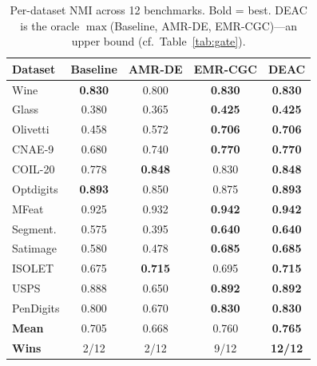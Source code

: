 \begin{table}[!t]
\centering
\caption{Per-dataset NMI across 12 benchmarks. Bold = best. DEAC is the oracle $\max$(Baseline, AMR-DE, EMR-CGC)---an upper bound (cf.\ Table~\ref{tab:gate}).}
\label{tab:nmi_per_dataset}
\footnotesize
\setlength{\tabcolsep}{4pt}
\begin{tabular}{lcccc}
\toprule
Dataset & Baseline & AMR-DE & EMR-CGC & \textbf{DEAC} \\
\midrule
Wine         & \textbf{0.830} & 0.800 & \textbf{0.830} & \textbf{0.830} \\
Glass        & 0.380 & 0.365 & \textbf{0.425} & \textbf{0.425} \\
Olivetti     & 0.458 & 0.572 & \textbf{0.706} & \textbf{0.706} \\
CNAE-9       & 0.680 & 0.740 & \textbf{0.770} & \textbf{0.770} \\
COIL-20      & 0.778 & \textbf{0.848} & 0.830 & \textbf{0.848} \\
Optdigits    & \textbf{0.893} & 0.850 & 0.875 & \textbf{0.893} \\
MFeat        & 0.925 & 0.932 & \textbf{0.942} & \textbf{0.942} \\
Segment.     & 0.575 & 0.395 & \textbf{0.640} & \textbf{0.640} \\
Satimage     & 0.580 & 0.478 & \textbf{0.685} & \textbf{0.685} \\
ISOLET       & 0.675 & \textbf{0.715} & 0.695 & \textbf{0.715} \\
USPS         & 0.888 & 0.650 & \textbf{0.892} & \textbf{0.892} \\
PenDigits    & 0.800 & 0.670 & \textbf{0.830} & \textbf{0.830} \\
\midrule
\textbf{Mean} & 0.705 & 0.668 & 0.760 & \textbf{0.765} \\
\textbf{Wins} & 2/12 & 2/12 & 9/12 & \textbf{12/12} \\
\bottomrule
\end{tabular}
\end{table}
